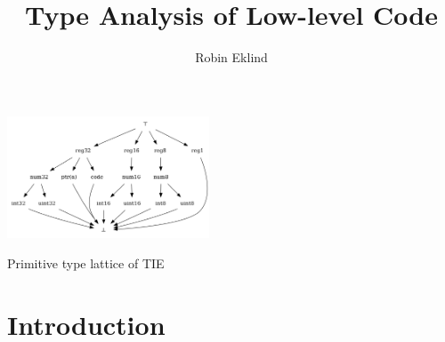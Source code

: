 \documentclass[10pt, a4paper, sigplan, authordraft]{acmart}
\title{Type Analysis of Low-level Code}
\author{Robin Eklind}
\affiliation{
	\institution{Royal Institute of Technology (KTH)}
	\city{Stockholm}
	\country{Sweden}
}
\begin{document}





\begin{teaserfigure}
	\centering
	\includegraphics[width=0.45\textwidth]{inc/base_type_lattice.png}
	\caption{Primitive type lattice of TIE}
	\label{fig:base_type_lattice}
\end{teaserfigure}


\maketitle



\section{Introduction}

\end{document}
